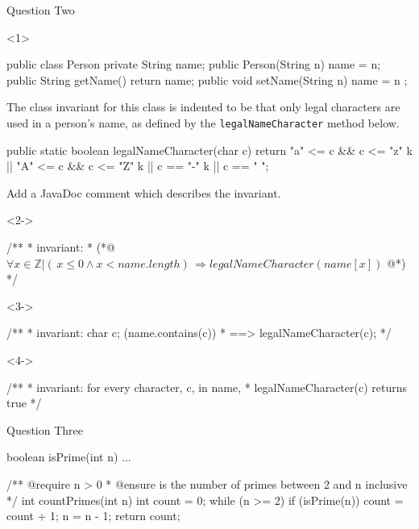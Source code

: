 \begin{frame}[t, fragile]{Question Two} \vspace{4pt}

\begin{onlyenv}<1>
\begin{java}
public class Person {
	private String name;
	public Person(String n) { name = n; }
	public String getName() { return name; }
	public void setName(String n) { name = n ; }
}
\end{java}
The class invariant for this class is indented to be that only legal characters are used in a person’s name, as defined by the \texttt{legalNameCharacter} method below.

\begin{java}
public static boolean legalNameCharacter(char c) {
	return "a" <= c && c <= "z" k ||
		   "A" <= c && c <= "Z" k ||
		   c == "-" k || c == " ";
}
\end{java}

Add a JavaDoc comment which describes the invariant.
\end{onlyenv}

\begin{onlyenv}<2->
\begin{java}
/**
  * invariant: 
  * (*@
$
\forall x \in \mathbb{Z} | (\,x \leq 0 \land x < name.length)\, \Rightarrow legalNameCharacter(name[x])
$ @*)
  */
\end{java}
\end{onlyenv}

\begin{onlyenv}<3->
\begin{java}
/**
  * invariant: \forall char c; (name.contains(c)) 
  *                   ==> legalNameCharacter(c);
  */
\end{java}
\end{onlyenv}

\begin{onlyenv}<4->
\begin{java}
/**
  * invariant: for every character, c, in name, 
  *	       legalNameCharacter(c) returns true
  */
\end{java}
\end{onlyenv}

\end{frame}

\begin{frame}[t, fragile]{Question Three} \vspace{4pt}

\begin{java}
boolean isPrime(int n) { ... }

/** @require n > 0
  * @ensure \result is the number of primes between 2 and n inclusive
  */
int countPrimes(int n) {
	int count = 0;
	while (n >= 2) {
		if (isPrime(n))
			count = count + 1;
		n = n - 1;
	}
	return count;
}
\end{java}

\end{frame}

